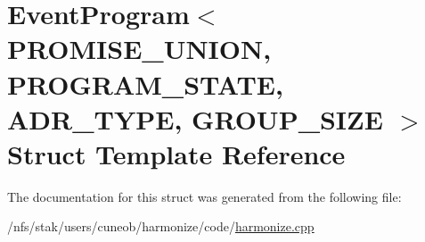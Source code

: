 \hypertarget{structEventProgram}{\section{Event\-Program$<$ P\-R\-O\-M\-I\-S\-E\-\_\-\-U\-N\-I\-O\-N, P\-R\-O\-G\-R\-A\-M\-\_\-\-S\-T\-A\-T\-E, A\-D\-R\-\_\-\-T\-Y\-P\-E, G\-R\-O\-U\-P\-\_\-\-S\-I\-Z\-E $>$ Struct Template Reference}
\label{structEventProgram}
}


The documentation for this struct was generated from the following file\-:\begin{DoxyCompactItemize}
\item 
/nfs/stak/users/cuneob/harmonize/code/\hyperlink{harmonize_8cpp}{harmonize.\-cpp}\end{DoxyCompactItemize}
